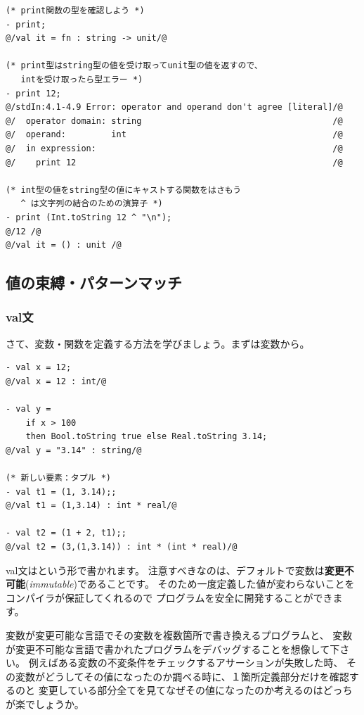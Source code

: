 \documentclass[11pt,a4paper]{jarticle}
\begin{document}
\begin{lstlisting}[caption=型エラー２,label=code:type-error2]
(* print関数の型を確認しよう *)
- print;
@/val it = fn : string -> unit/@

(* print型はstring型の値を受け取ってunit型の値を返すので、
   intを受け取ったら型エラー *)
- print 12;
@/stdIn:4.1-4.9 Error: operator and operand don't agree [literal]/@
@/  operator domain: string                                      /@
@/  operand:         int                                         /@
@/  in expression:                                               /@
@/    print 12                                                   /@

(* int型の値をstring型の値にキャストする関数をはさもう
   ^ は文字列の結合のための演算子 *)
- print (Int.toString 12 ^ "\n");
@/12 /@
@/val it = () : unit /@
\end{lstlisting}


\subsection{値の束縛・パターンマッチ}
\subsubsection{val文}
さて、変数・関数を定義する方法を学びましょう。まずは変数から。
\begin{lstlisting}[caption={val文}, label={code:first-definition}]
- val x = 12;
@/val x = 12 : int/@

- val y =
    if x > 100
    then Bool.toString true else Real.toString 3.14;
@/val y = "3.14" : string/@

(* 新しい要素：タプル *)
- val t1 = (1, 3.14);;
@/val t1 = (1,3.14) : int * real/@

- val t2 = (1 + 2, t1);;
@/val t2 = (3,(1,3.14)) : int * (int * real)/@
\end{lstlisting}

val文はという形で書かれます。
注意すべきなのは、デフォルトで変数は{\bfseries 変更不可能}({\itshape immutable})であることです。
そのため一度定義した値が変わらないことをコンパイラが保証してくれるので
プログラムを安全に開発することができます。

変数が変更可能な言語でその変数を複数箇所で書き換えるプログラムと、
変数が変更不可能な言語で書かれたプログラムをデバッグすることを想像して下さい。
例えばある変数の不変条件をチェックするアサーションが失敗した時、
その変数がどうしてその値になったのか調べる時に、１箇所定義部分だけを確認するのと
変更している部分全てを見てなぜその値になったのか考えるのはどっちが楽でしょうか。
\end{document}
